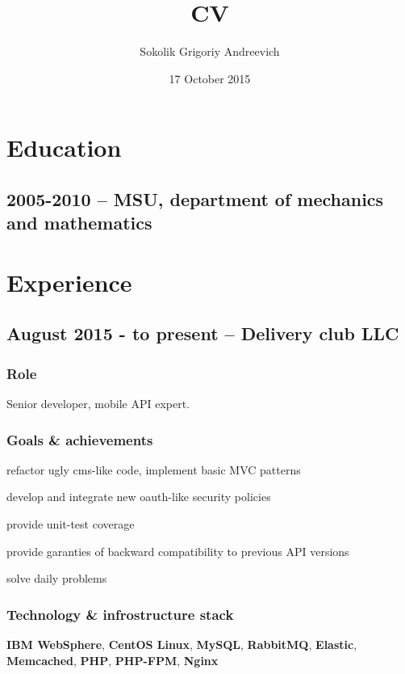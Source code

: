 \documentclass[10pt, a4paper, english]{article}
\title {CV}
\author{Sokolik Grigoriy Andreevich}
\date {17 October 2015}
\begin{document}
\maketitle


\section* {Education}
\subsection* {2005-2010 -- MSU, department of mechanics and mathematics}


\section* {Experience}
  \subsection* {August 2015 - to present -- \textbf{Delivery club LLC}}
    \subsubsection* {Role}
      Senior developer, mobile API expert.
    \subsubsection* {Goals \& achievements}
      \begin {list}{\textbullet}{}
        \item refactor ugly cms-like code, implement basic MVC patterns
        \item develop and integrate new oauth-like security policies
        \item provide unit-test coverage
        \item provide garanties of backward compatibility to previous API versions
        \item solve daily problems
      \end{list}
    \subsubsection* {Technology \& infrostructure stack}
      \textbf{IBM WebSphere}, \textbf{CentOS Linux}, \textbf{MySQL}, \textbf{RabbitMQ}, \textbf{Elastic},
      \textbf{Memcached}, \textbf{PHP}, \textbf{PHP-FPM}, \textbf{Nginx}
\end{document}
